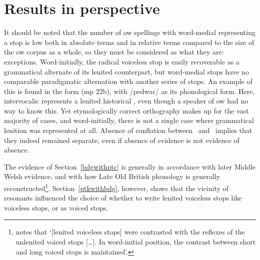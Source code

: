 \section{Results in perspective}
\label{sec:results-perspective}
It should be noted that the number of \gls{ow} spellings with word-medial  representing a stop is low both in absolute terms and in relative terms compared to the size of the \gls{ow} corpus as a whole, so they must be considered as what they are: exceptions. Word-initially, the radical voiceless stop is easily recoverable as a grammatical alternate of its lenited counterpart, but word-medial  stops have no comparable  paradigmatic alternation with another series of stops. An example of this is found in the form  (\gls{mp} 22b), with /pedwar/ as its phonological form. Here, intervocalic  represents  a lenited historical , even though a speaker of \gls{ow} had no way to know this. Yet etymologically correct orthography makes up for the vast majority of  cases, and word-initially, there is not  a single case where grammatical lenition was represented at all. Absence of conflation between \xD\ and \lT\  implies that they indeed remained separate, even if absence of evidence is not evidence of absence.

The evidence of Section~\ref{bdgwithptc} is generally in accordance with later Middle Welsh evidence, and with how Late Old British phonology is generally reconstructed\footnote{\Textcite[31]{schrijver_old_2011} notes that `[lenited voiceless stops] were contrasted with the reflexes of the unlenited voiced stops […]. In word-initial position, the contrast between short and long voiced stops is maintained'.}. Section~\ref{ptkwithbdg}, however, shows that the vicinity of resonants influenced the choice of whether to write lenited voiceless stops like voiceless stops, or as voiced stops.




